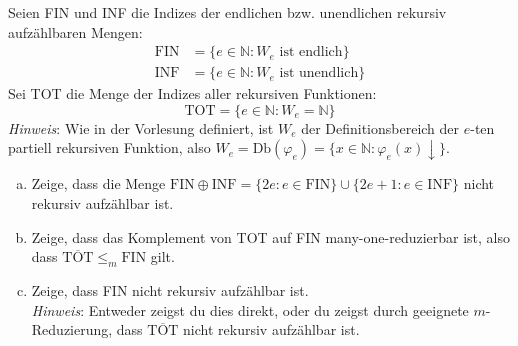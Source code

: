 \documentclass[german,headsepline]{scrartcl}
\theoremstyle{definition}
\begin{document}
	\begin{question}
		Seien FIN und INF die Indizes der endlichen bzw. unendlichen rekursiv aufzählbaren Mengen:
		\begin{align*}
			\text{FIN} &= \{e\in\mathbb{N}\colon W_e\text{ ist endlich}\} \\
			\text{INF} &= \{e\in\mathbb{N}\colon W_e\text{ ist unendlich}\}
		\end{align*}
		Sei TOT die Menge der Indizes aller rekursiven Funktionen:
			\[\text{TOT}=\{e\in\mathbb{N}\colon W_e=\mathbb{N}\}\]
		\textit{Hinweis}: Wie in der Vorlesung definiert,
		ist $W_e$ der Definitionsbereich der $e$-ten partiell rekursiven Funktion,
		also $W_e=\text{Db}(\varphi_e)=\{x\in\mathbb{N}\colon\varphi_e(x)\downarrow\}$.
		\begin{enumerate}[(a)]
			\item Zeige, dass die Menge
				$\text{FIN}\oplus\text{INF}=\{2e\colon e\in\text{FIN}\}\cup\{2e+1\colon e\in\text{INF}\}$
				nicht rekursiv aufzählbar ist.
			\item Zeige, dass das Komplement von TOT auf FIN many-one-reduzierbar ist,
				also dass $\overline{\text{TOT}}\leq_m\text{FIN}$ gilt.
			\item Zeige, dass FIN nicht rekursiv aufzählbar ist. \\
				\textit{Hinweis}: Entweder zeigst du dies direkt,
				oder du zeigst durch geeignete $m$-Reduzierung,
				dass $\overline{\text{TOT}}$ nicht rekursiv aufzählbar ist.
		\end{enumerate}
	\end{question}
\end{document}
